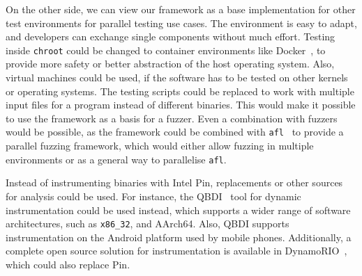 On the other side, we can view our framework as a base implementation for other
test environments for parallel testing use cases. The environment is easy to
adapt, and developers can exchange single components without much effort.
Testing inside \texttt{chroot} could be changed to container environments like
Docker~\cite{docker}, to provide more safety or better abstraction of the host
operating system. Also, virtual machines could be used, if the software has to
be tested on other kernels or operating systems. The testing scripts could be
replaced to work with multiple input files for a program instead of different
binaries. This would make it possible to use the framework as a basis for a
fuzzer. Even a combination with fuzzers would be possible, as the framework
could be combined with \texttt{afl}~\cite{aflweb} to provide a parallel fuzzing
framework, which would either allow fuzzing in multiple environments or as a
general way to parallelise \texttt{afl}.

Instead of instrumenting binaries with Intel Pin, replacements or other sources
for analysis could be used. For instance, the QBDI~\cite{qbdi} tool for dynamic
instrumentation could be used instead, which supports a wider range of software
architectures, such as \texttt{x86\_32}, and AArch64. Also, QBDI supports
instrumentation on the Android platform used by mobile phones. Additionally, a
complete open source solution for instrumentation is available in
DynamoRIO~\cite{dynrio}, which could also replace Pin.

